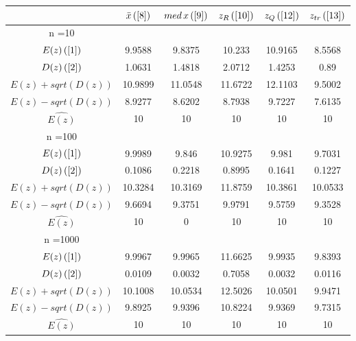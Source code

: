 \begin{tabular}{|c|c|c|c|c|c|}
\hline
 & $\bar{x} \, (\ref{8})$ & $med \, x \, (\ref{9})$ & $z_R \, (\ref{10})$ & $z_Q \, (\ref{12})$ & $z_{tr} \, (\ref{13})$ \\
\hline
n =10 &  &  &  &  & \\
\hline
$E(z) \, (\ref{1})$ & 9.9588 & 9.8375 & 10.233 & 10.9165 & 8.5568\\
\hline
$D(z) \, (\ref{2})$ & 1.0631 & 1.4818 & 2.0712 & 1.4253 & 0.89\\
\hline
$E(z)+sqrt(D(z))$ & 10.9899 & 11.0548 & 11.6722 & 12.1103 & 9.5002\\
\hline
$E(z)-sqrt(D(z))$ & 8.9277 & 8.6202 & 8.7938 & 9.7227 & 7.6135\\
\hline
$\hat{E(z)}$ & 10 & 10 & 10 & 10 & 10\\
\hline
n =100 &  &  &  &  & \\
\hline
$E(z) \, (\ref{1})$ & 9.9989 & 9.846 & 10.9275 & 9.981 & 9.7031\\
\hline
$D(z) \, (\ref{2})$ & 0.1086 & 0.2218 & 0.8995 & 0.1641 & 0.1227\\
\hline
$E(z)+sqrt(D(z))$ & 10.3284 & 10.3169 & 11.8759 & 10.3861 & 10.0533\\
\hline
$E(z)-sqrt(D(z))$ & 9.6694 & 9.3751 & 9.9791 & 9.5759 & 9.3528\\
\hline
$\hat{E(z)}$ & 10 & 0 & 10 & 10 & 10\\
\hline
n =1000 &  &  &  &  & \\
\hline
$E(z) \, (\ref{1})$ & 9.9967 & 9.9965 & 11.6625 & 9.9935 & 9.8393\\
\hline
$D(z) \, (\ref{2})$ & 0.0109 & 0.0032 & 0.7058 & 0.0032 & 0.0116\\
\hline
$E(z)+sqrt(D(z))$ & 10.1008 & 10.0534 & 12.5026 & 10.0501 & 9.9471\\
\hline
$E(z)-sqrt(D(z))$ & 9.8925 & 9.9396 & 10.8224 & 9.9369 & 9.7315\\
\hline
$\hat{E(z)}$ & 10 & 10 & 10 & 10 & 10\\
\hline
\end{tabular}